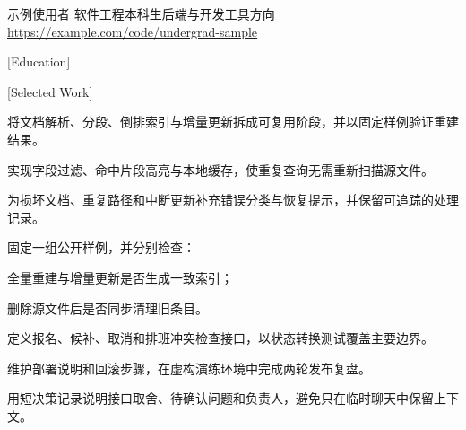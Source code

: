 
\begin{resumeheaderblock}[2]
  {示例使用者}
  {软件工程本科生\dotsep 后端与开发工具方向}
    {}
    {\url{https://example.com/code/undergrad-sample}}
\end{resumeheaderblock}

[Education]

\resumemetarow
  {}
  {}
\vspace{0.35mm}
\resumemetarow
  {}
  {\hspace{0.8mm}}

[Selected Work]

\begin{resumelist}
  \item {}将文档解析、分段、倒排索引与增量更新拆成可复用阶段，并以固定样例验证重建结果。
  \item {}实现字段过滤、命中片段高亮与本地缓存，使重复查询无需重新扫描源文件。
  \item {}为损坏文档、重复路径和中断更新补充错误分类与恢复提示，并保留可追踪的处理记录。
  \item {}固定一组公开样例，并分别检查：
    \begin{resumelist}[leftmargin=3.8mm,itemsep=0.2mm,topsep=0.2mm]
      \item 全量重建与增量更新是否生成一致索引；
      \item 删除源文件后是否同步清理旧条目。
    \end{resumelist}
\end{resumelist}

\begin{resumelist}
  \item {}定义报名、候补、取消和排班冲突检查接口，以状态转换测试覆盖主要边界。
  \item {}维护部署说明和回滚步骤，在虚构演练环境中完成两轮发布复盘。
  \item {}用短决策记录说明接口取舍、待确认问题和负责人，避免只在临时聊天中保留上下文。
\end{resumelist}

